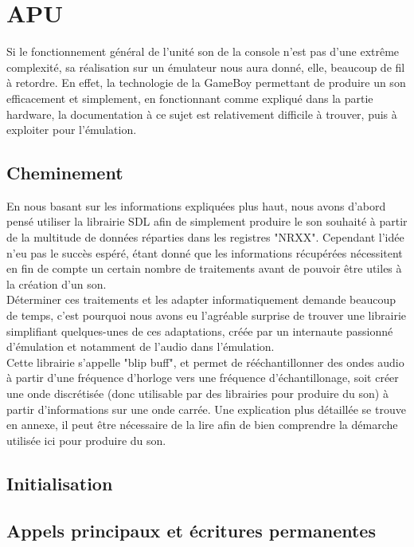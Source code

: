\documentclass{report}
\begin{document}
\section{APU}
	Si le fonctionnement général de l'unité son de la console n'est pas d'une extrême complexité, sa réalisation sur un émulateur nous aura donné, elle, beaucoup de fil à retordre.
	En effet, la technologie de la GameBoy permettant de produire un son efficacement et simplement, en fonctionnant comme expliqué dans la partie hardware, la documentation à ce sujet est relativement difficile à trouver, puis à exploiter pour l'émulation.\\
\subsection{Cheminement}
	En nous basant sur les informations expliquées plus haut, nous avons d'abord pensé utiliser la librairie SDL afin de simplement produire le son souhaité à partir de la multitude de données réparties dans les registres "NRXX". Cependant l'idée n'eu pas le succès espéré, étant donné que les informations récupérées nécessitent en fin de compte un certain nombre de traitements avant de pouvoir être utiles à la création d'un son.\\
	Déterminer ces traitements et les adapter informatiquement demande beaucoup de temps, c'est pourquoi nous avons eu l'agréable surprise de trouver une librairie simplifiant quelques-unes de ces adaptations, créée par un internaute passionné d'émulation et notamment de l'audio dans l'émulation.\\
	Cette librairie s'appelle "blip buff", et permet de rééchantillonner des ondes audio à partir d'une fréquence d'horloge vers une fréquence d'échantillonage, soit créer une onde discrétisée (donc utilisable par des librairies pour produire du son) à partir d'informations sur une onde carrée. 
	Une explication plus détaillée se trouve en annexe, il peut être nécessaire de la lire afin de bien comprendre la démarche utilisée ici pour produire du son.
\subsection{Initialisation}
\subsection{Appels principaux et écritures permanentes}
\end{document}
